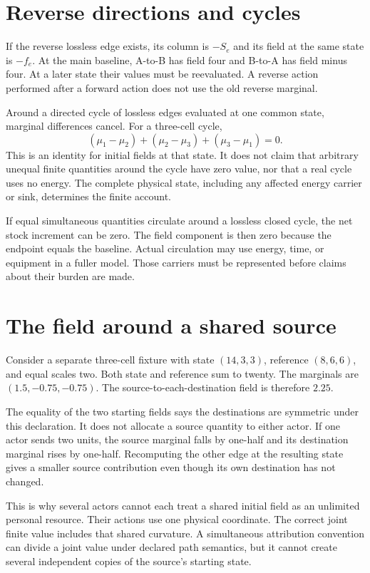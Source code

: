 \section{Reverse directions and cycles}
If the reverse lossless edge exists, its column is \(-S_e\) and its field at the same state is \(-f_e\). At the main baseline, A-to-B has field four and B-to-A has field minus four. At a later state their values must be reevaluated. A reverse action performed after a forward action does not use the old reverse marginal.

Around a directed cycle of lossless edges evaluated at one common state, marginal differences cancel. For a three-cell cycle,
\begin{equation}
 (\mu_1-\mu_2)+(\mu_2-\mu_3)+(\mu_3-\mu_1)=0.
\end{equation}
This is an identity for initial fields at that state. It does not claim that arbitrary unequal finite quantities around the cycle have zero value, nor that a real cycle uses no energy. The complete physical state, including any affected energy carrier or sink, determines the finite account.

If equal simultaneous quantities circulate around a lossless closed cycle, the net stock increment can be zero. The field component is then zero because the endpoint equals the baseline. Actual circulation may use energy, time, or equipment in a fuller model. Those carriers must be represented before claims about their burden are made.

\section{The field around a shared source}
Consider a separate three-cell fixture with state \((14,3,3)\), reference \((8,6,6)\), and equal scales two. Both state and reference sum to twenty. The marginals are \((1.5,-0.75,-0.75)\). The source-to-each-destination field is therefore \(2.25\).

The equality of the two starting fields says the destinations are symmetric under this declaration. It does not allocate a source quantity to either actor. If one actor sends two units, the source marginal falls by one-half and its destination marginal rises by one-half. Recomputing the other edge at the resulting state gives a smaller source contribution even though its own destination has not changed.

This is why several actors cannot each treat a shared initial field as an unlimited personal resource. Their actions use one physical coordinate. The correct joint finite value includes that shared curvature. A simultaneous attribution convention can divide a joint value under declared path semantics, but it cannot create several independent copies of the source's starting state.

